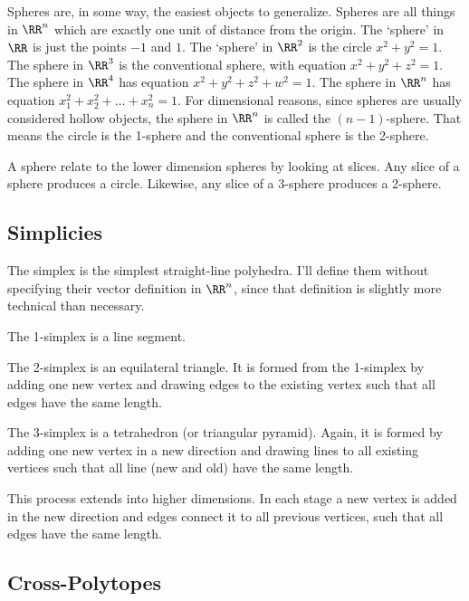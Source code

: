 \documentclass[fleqn]{report}
\begin{document}
Spheres are, in some way, the easiest objects to generalize.
Spheres are all things in $\RR^n$ which are exactly one unit
of distance from the origin. The `sphere' in $\RR$ is just
the points $-1$ and $1$. The `sphere' in $\RR^2$ is the circle
$x^2 + y^2 = 1$. The sphere in $\RR^3$ is the conventional
sphere, with equation $x^2 + y^2 + z^2 = 1$. The sphere in
$\RR^4$ has equation $x^2 + y^2 + z^2 + w^2 = 1$. The sphere
in $\RR^n$ has equation $x_1^2 + x_2^2 + \ldots + x_n^2 = 1$.
For dimensional reasons, since spheres are usually
considered hollow objects, the sphere in $\RR^n$ is
called the $(n-1)$-sphere. That means the circle is the
1-sphere and the conventional sphere is the 2-sphere.

A sphere relate to the lower dimension spheres by looking at
slices. Any slice of a sphere produces a circle. Likewise, any
slice of a 3-sphere produces a 2-sphere.
\clearpage

\subsection{Simplicies}
\label{simplices}

The simplex is the simplest straight-line polyhedra.
I'll define them without specifying their vector definition in
$\RR^n$, since that definition is slightly more technical than
necessary.
\begin{smallitemize}
\item The 1-simplex is a line segment. 
\item The 2-simplex is an equilateral triangle. It is formed
from the 1-simplex by adding one new vertex and drawing edges
to the existing vertex such that all edges have the same
length.
\item The 3-simplex is a tetrahedron (or triangular pyramid).
Again, it is formed by adding one new vertex in a new
direction and drawing lines to all existing vertices such that
all line (new and old) have the same length.
\item This process extends into higher dimensions. In each stage a new
vertex is added in the new direction and edges connect it to
all previous vertices, such that all edges have the same
length. 
\end{smallitemize}

\subsection{Cross-Polytopes}
\label{cross-polytopes}
\end{document}
